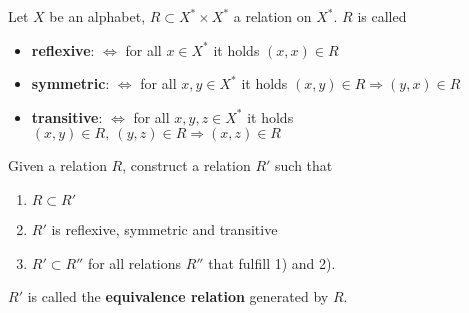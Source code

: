 \bigskip
\begin{exercise}
Let $X$ be an alphabet, $R \subset X^* \times X^*$ a relation on $X^*$. $R$ is
called
\begin{itemize}
  \item {\bf reflexive}: $\Leftrightarrow$ for all $x \in X^*$ it holds $(x, x)
  \in R$
  \item {\bf symmetric}: $\Leftrightarrow$ for all $x, y \in X^*$ it holds $(x,
  y) \in R \Rightarrow (y, x) \in R$
  \item {\bf transitive}: $\Leftrightarrow$ for all $x, y, z \in X^*$ it holds
  $(x, y) \in R,\ (y, z) \in R \Rightarrow (x, z) \in R$
\end{itemize}

Given a relation $R$, construct a relation $R'$ such that
\begin{enumerate}
  \item $R \subset R'$
  \item $R'$ is reflexive, symmetric and transitive
  \item $R' \subset R''$ for all relations $R''$ that fulfill 1) and 2).
\end{enumerate}

$R'$ is called the {\bf equivalence relation} generated by $R$. 
\end{exercise}
